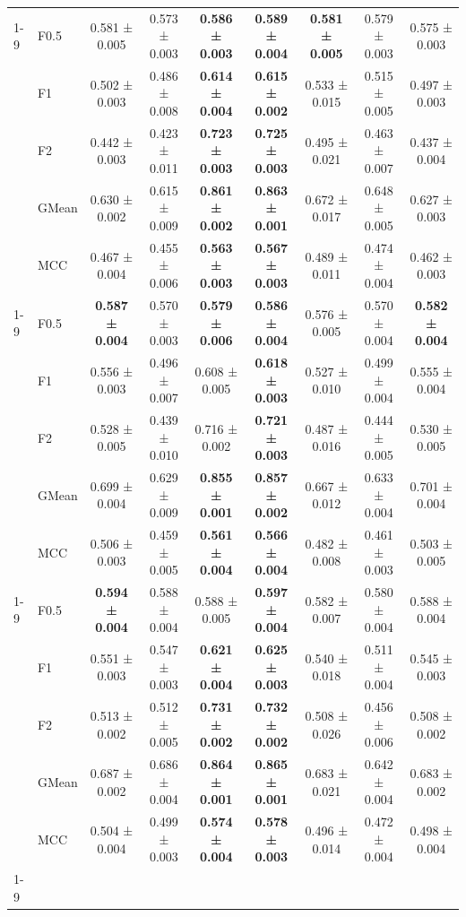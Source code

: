 \begin{table}[H]
{\begin{tabular}{llccccccc}
\cline{1-9}
\multirow[t]{5}{*}{RandomForest} & F0.5 & 0.581 ± 0.005 & 0.573 ± 0.003 & \textbf{0.586 ± 0.003} & \textbf{0.589 ± 0.004} & \textbf{0.581 ± 0.005} & 0.579 ± 0.003 & 0.575 ± 0.003 \\
 & F1 & 0.502 ± 0.003 & 0.486 ± 0.008 & \textbf{0.614 ± 0.004} & \textbf{0.615 ± 0.002} & 0.533 ± 0.015 & 0.515 ± 0.005 & 0.497 ± 0.003 \\
 & F2 & 0.442 ± 0.003 & 0.423 ± 0.011 & \textbf{0.723 ± 0.003} & \textbf{0.725 ± 0.003} & 0.495 ± 0.021 & 0.463 ± 0.007 & 0.437 ± 0.004 \\
 & GMean & 0.630 ± 0.002 & 0.615 ± 0.009 & \textbf{0.861 ± 0.002} & \textbf{0.863 ± 0.001} & 0.672 ± 0.017 & 0.648 ± 0.005 & 0.627 ± 0.003 \\
 & MCC & 0.467 ± 0.004 & 0.455 ± 0.006 & \textbf{0.563 ± 0.003} & \textbf{0.567 ± 0.003} & 0.489 ± 0.011 & 0.474 ± 0.004 & 0.462 ± 0.003 \\
\cline{1-9}
\multirow[t]{5}{*}{TabM} & F0.5 & \textbf{0.587 ± 0.004} & 0.570 ± 0.003 & \textbf{0.579 ± 0.006} & \textbf{0.586 ± 0.004} & 0.576 ± 0.005 & 0.570 ± 0.004 & \textbf{0.582 ± 0.004} \\
 & F1 & 0.556 ± 0.003 & 0.496 ± 0.007 & 0.608 ± 0.005 & \textbf{0.618 ± 0.003} & 0.527 ± 0.010 & 0.499 ± 0.004 & 0.555 ± 0.004 \\
 & F2 & 0.528 ± 0.005 & 0.439 ± 0.010 & 0.716 ± 0.002 & \textbf{0.721 ± 0.003} & 0.487 ± 0.016 & 0.444 ± 0.005 & 0.530 ± 0.005 \\
 & GMean & 0.699 ± 0.004 & 0.629 ± 0.009 & \textbf{0.855 ± 0.001} & \textbf{0.857 ± 0.002} & 0.667 ± 0.012 & 0.633 ± 0.004 & 0.701 ± 0.004 \\
 & MCC & 0.506 ± 0.003 & 0.459 ± 0.005 & \textbf{0.561 ± 0.004} & \textbf{0.566 ± 0.004} & 0.482 ± 0.008 & 0.461 ± 0.003 & 0.503 ± 0.005 \\
\cline{1-9}
\multirow[t]{5}{*}{XGBoost} & F0.5 & \textbf{0.594 ± 0.004} & 0.588 ± 0.004 & 0.588 ± 0.005 & \textbf{0.597 ± 0.004} & 0.582 ± 0.007 & 0.580 ± 0.004 & 0.588 ± 0.004 \\
 & F1 & 0.551 ± 0.003 & 0.547 ± 0.003 & \textbf{0.621 ± 0.004} & \textbf{0.625 ± 0.003} & 0.540 ± 0.018 & 0.511 ± 0.004 & 0.545 ± 0.003 \\
 & F2 & 0.513 ± 0.002 & 0.512 ± 0.005 & \textbf{0.731 ± 0.002} & \textbf{0.732 ± 0.002} & 0.508 ± 0.026 & 0.456 ± 0.006 & 0.508 ± 0.002 \\
 & GMean & 0.687 ± 0.002 & 0.686 ± 0.004 & \textbf{0.864 ± 0.001} & \textbf{0.865 ± 0.001} & 0.683 ± 0.021 & 0.642 ± 0.004 & 0.683 ± 0.002 \\
 & MCC & 0.504 ± 0.004 & 0.499 ± 0.003 & \textbf{0.574 ± 0.004} & \textbf{0.578 ± 0.003} & 0.496 ± 0.014 & 0.472 ± 0.004 & 0.498 ± 0.004 \\
\cline{1-9}
\bottomrule
\end{tabular}
    }
\end{table}
